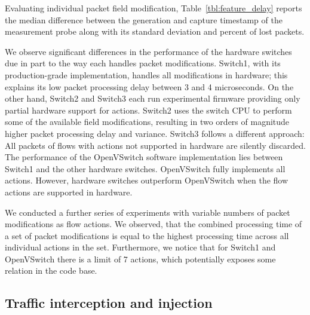Evaluating individual packet field modification,
Table~\ref{tbl:feature_delay} reports the median difference between
the generation and capture timestamp of the measurement probe along
with its standard deviation and percent of lost packets.

We observe significant differences in the performance of the hardware
switches due in part to the way each handles packet
modifications. Switch1, with its production-grade implementation,
handles all modifications in hardware; this explains its low packet
processing delay between 3 and 4 microseconds. On the other hand,
Switch2 and Switch3 each run experimental firmware providing only
partial hardware support for \of actions. Switch2 uses the switch
CPU to perform some of the available field modifications, resulting in two orders
of magnitude higher packet processing delay and variance.
Switch3 follows a different approach: All packets of flows with
actions not supported in hardware are silently discarded. The
performance of the OpenVSwitch software implementation lies between
Switch1 and the other hardware switches.  OpenVSwitch fully implements
all \of actions. However, hardware switches outperform
OpenVSwitch when the flow actions are supported in hardware.
%

We conducted a further series of experiments with variable numbers of packet
modifications as flow actions. We observed, that the combined processing time of
a set of packet modifications is equal to the highest processing time across all
individual actions in the set. Furthermore, we notice that for Switch1 and 
OpenVSwitch there is a limit of 7 actions, which potentially exposes some
relation in the code base.

\subsection{Traffic interception and injection}\label{sec:results-pktin}

